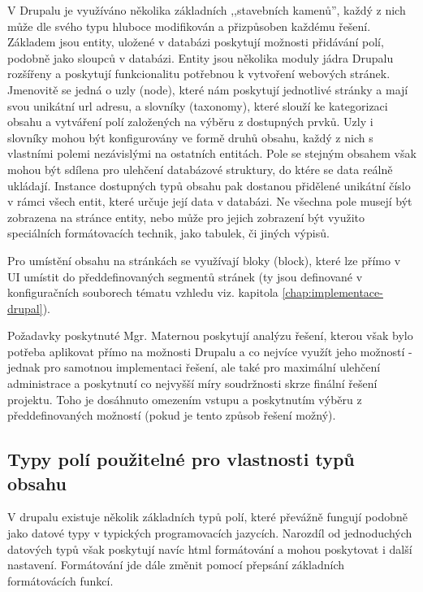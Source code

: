 V Drupalu je využíváno několika základních ,,stavebních kamenů'', každý z nich může dle svého typu hluboce modifikován a přizpůsoben každému řešení. Základem jsou entity, uložené v databázi poskytují možnosti přidávání polí, podobně jako sloupců v databázi. Entity jsou několika moduly jádra Drupalu rozšířeny a poskytují funkcionalitu potřebnou k vytvoření webových stránek. Jmenovitě se jedná o uzly (node), které nám poskytují jednotlivé stránky a mají svou unikátní url adresu, a slovníky (taxonomy), které slouží ke kategorizaci obsahu a vytváření polí založených na výběru z dostupných prvků. Uzly i slovníky mohou být konfigurovány ve formě druhů obsahu, každý z nich s vlastními polemi nezávislými na ostatních entitách. Pole se stejným obsahem však mohou být sdílena pro ulehčení databázové struktury, do ktére se data reálně ukládají. Instance dostupných typů obsahu pak dostanou přidělené unikátní číslo v rámci všech entit, které určuje její data v databázi. Ne všechna pole musejí být zobrazena na stránce entity, nebo může pro jejich zobrazení být využito speciálních formátovacích technik, jako tabulek, či jiných výpisů.

Pro umístění obsahu na stránkách se využívají bloky (block), které lze přímo v UI umístit do předdefinovaných segmentů stránek (ty jsou definované v konfiguračních souborech tématu vzhledu viz. kapitola \ref{chap:implementace-drupal}).

Požadavky \cite{omaterna2013} poskytnuté Mgr. Maternou poskytují analýzu řešení, kterou však bylo potřeba aplikovat přímo na možnosti Drupalu a co nejvíce využít jeho možností - jednak pro samotnou implementaci řešení, ale také pro maximální ulehčení administrace a poskytnutí co nejvyšší míry soudržnosti skrze finální řešení projektu. Toho je dosáhnuto omezením vstupu a poskytnutím výběru z předdefinovaných možností (pokud je tento způsob řešení možný).

\subsection{Typy polí použitelné pro vlastnosti typů obsahu}
V drupalu existuje několik základních typů polí, které převážně fungují podobně jako datové typy v typických programovacích jazycích. Narozdíl od jednoduchých datových typů však poskytují navíc html formátování a mohou poskytovat i další nastavení. Formátování jde dále změnit pomocí přepsání základních formátovácích funkcí.

